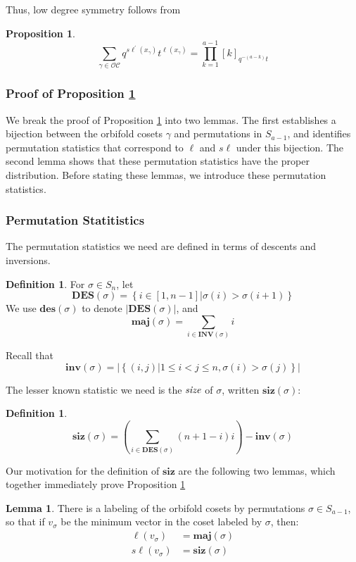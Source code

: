 \documentclass{amsart}[12pt]
\theoremstyle{definition}
\newtheorem{lemma}[dummy]{Lemma}
\newtheorem{definition}[dummy]{Definition}
\newtheorem{proposition}[dummy]{Proposition}
\newcommand{\OC}{\mathcal{OC}}
\newcommand{\sk}{s\ell}
\newcommand{\inv}{\mathbf{inv}}
\newcommand{\INV}{\mathbf{INV}}
\newcommand{\DES}{\mathbf{DES}}
\newcommand{\des}{\mathbf{des}}
\newcommand{\maj}{\mathbf{maj}}
\newcommand{\siz}{\mathbf{siz}}
\begin{document}
Thus, low degree symmetry follows from
\begin{proposition} \label{prop:orbcosets}
$$\sum_{\gamma\in\OC} q^{\sk^\prime(x_\gamma)}t^{\ell(x_\gamma)}=\prod_{k=1}^{a-1}[k]_{q^{-(a-k)}t}$$ 

\end{proposition}
  
\subsubsection{Proof of Proposition \ref{prop:orbcosets}}

We break the proof of Proposition \ref{prop:orbcosets} into two lemmas.  The first establishes a bijection between the orbifold cosets $\gamma$ and permutations in $S_{a-1}$, and identifies permutation statistics that correspond to $\ell$ and $\sk$ under this bijection.  The second lemma shows that these permutation statistics have the proper distribution.  Before stating these lemmas, we introduce these permutation statistics.

\subsubsection{Permutation Statitistics}
The permutation statistics we need are defined in terms of descents and inversions.
\begin{definition} \label{def:standardpermutations}
For $\sigma\in S_n$, let 
$$\DES(\sigma)=\left\{i\in [1, n-1] \Big | \sigma(i)>\sigma(i+1)\right\}$$
We use $\des(\sigma)$ to denote $|\DES(\sigma)|$, and 
$$\maj(\sigma)=\sum_{i\in\INV(\sigma)} i$$

Recall that 
$$\inv(\sigma)=\left|\left\{(i,j)\big| 1\leq i<j\leq n, \sigma(i)>\sigma(j)\right\}\right|$$
\end{definition}

The lesser known statistic we need is the $\emph{size}$ of $\sigma$, written $\siz(\sigma)$: 

\begin{definition} \label{def:sizepermutation}
$$\siz(\sigma)=\left(\sum_{i\in\DES(\sigma)} (n+1-i)i\right)-\inv(\sigma)$$
\end{definition}

Our motivation for the definition of $\siz$ are the following two lemmas, which together immediately prove Proposition \ref{prop:orbcosets}

\begin{lemma} \label{lem:sizmaj1}
There is a labeling of the orbifold cosets by permutations $\sigma\in S_{a-1}$, so that if $v_\sigma$ be the minimum vector in the coset labeled by $\sigma$, then:
\begin{align*}
\ell(v_\sigma)&=\maj(\sigma) \\
\sk(v_\sigma)&=\siz(\sigma)\\
\end{align*}

\end{lemma}
\end{document}
